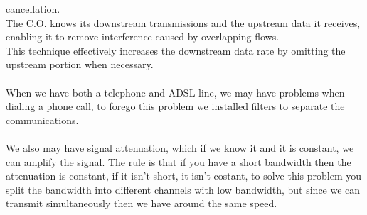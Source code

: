 \documentclass[11pt, a4paper]{article}
\begin{document}
cancellation.\\
The C.O. knows its downstream transmissions and the upstream data it receives, enabling
it to remove interference caused by overlapping flows.\\
This technique effectively increases the downstream data rate by omitting the upstream
portion when necessary.\\\\
When we have both a telephone and ADSL line, we may have problems when dialing a phone call, to forego this problem we installed filters to separate the communications.\\\\
We also may have signal attenuation, which if we know it and it is constant, we can amplify the signal. The rule is that if you have a short bandwidth then the attenuation is constant, if it isn't short, it isn't costant, to solve this problem you split the bandwidth into different channels with low bandwidth, but since we can transmit simultaneously then we have around the same speed.
\end{document}
